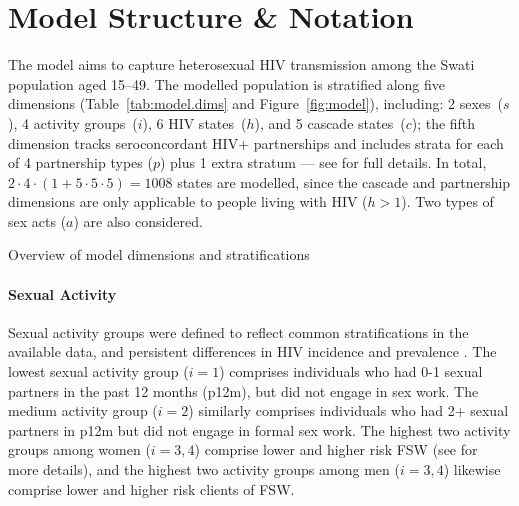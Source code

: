 \section{Model Structure \& Notation}\label{mod.str}
The model aims to capture heterosexual HIV transmission among the Swati population aged 15--49.
The modelled population is stratified along five dimensions
(Table~\ref{tab:model.dims} and Figure~\ref{fig:model}), including:
2 sexes~($s$), 4 activity groups~($i$), 6 HIV states~($h$), and 5 cascade states~($c$);
the fifth dimension tracks seroconcordant HIV+ partnerships
and includes strata for each of 4 partnership types ($p$) plus 1 extra stratum
--- see  for full details.
In total, $2 \cdot 4 \cdot (1 + 5 \cdot 5 \cdot 5) = 1008$ states are modelled,
since the cascade and partnership dimensions are only applicable to people living with HIV ($h>1$).
Two types of sex acts ($a$) are also considered.
\begin{table}[h]
  \centering
  \caption{Overview of model dimensions and stratifications}
  \label{tab:model.dims}
  
\end{table}

\paragraph{Sexual Activity}
Sexual activity groups were defined to reflect common stratifications in the available data,
and persistent differences in HIV incidence and prevalence
\cite{SDHS2006,Bicego2013,Justman2016,SHIMS2}.
The lowest sexual activity group ($i=1$) comprises
individuals who had 0-1 sexual partners in the past 12 months (p12m),
but did not engage in sex work.
The medium activity group ($i=2$) similarly comprises
individuals who had 2+ sexual partners in p12m
but did not engage in formal sex work.
The highest two activity groups among women ($i=3,4$) comprise
lower and higher risk FSW (see  for more details), and
the highest two activity groups among men ($i=3,4$) likewise comprise
lower and higher risk clients of FSW.
